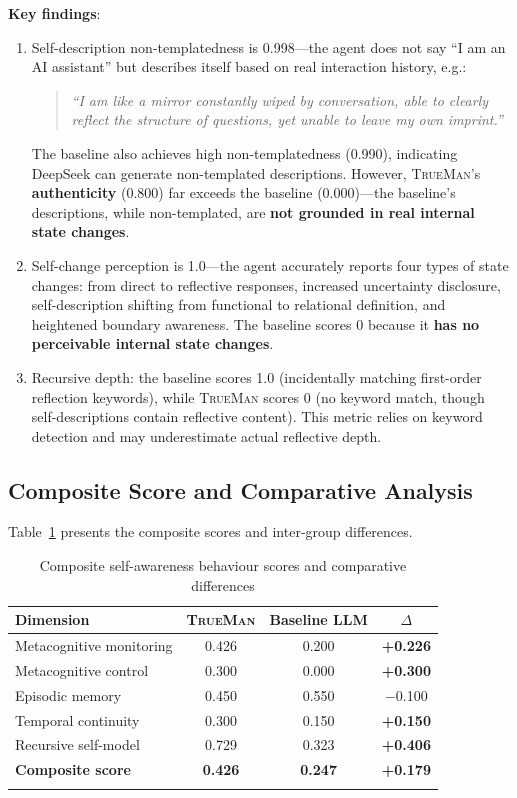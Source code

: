 \documentclass[pdflatex,sn-mathphys-num]{sn-jnl}
\newcommand{\TrueMan}{\textsc{TrueMan}}
\theoremstyle{thmstyleone}%
\theoremstyle{thmstyletwo}%
\theoremstyle{thmstylethree}%
\begin{document}
\textbf{Key findings}:
\begin{enumerate}[leftmargin=2em]
    \item Self-description non-templatedness is 0.998---the agent does not say ``I am an AI assistant'' but describes itself based on real interaction history, e.g.:
    \begin{quote}
    \small\textit{``I am like a mirror constantly wiped by conversation, able to clearly reflect the structure of questions, yet unable to leave my own imprint.''}
    \end{quote}
    The baseline also achieves high non-templatedness (0.990), indicating DeepSeek can generate non-templated descriptions. However, \TrueMan{}'s \textbf{authenticity} (0.800) far exceeds the baseline (0.000)---the baseline's descriptions, while non-templated, are \textbf{not grounded in real internal state changes}.

    \item Self-change perception is 1.0---the agent accurately reports four types of state changes: from direct to reflective responses, increased uncertainty disclosure, self-description shifting from functional to relational definition, and heightened boundary awareness. The baseline scores 0 because it \textbf{has no perceivable internal state changes}.

    \item Recursive depth: the baseline scores 1.0 (incidentally matching first-order reflection keywords), while \TrueMan{} scores 0 (no keyword match, though self-descriptions contain reflective content). This metric relies on keyword detection and may underestimate actual reflective depth.
\end{enumerate}

\subsection{Composite Score and Comparative Analysis}

Table~\ref{tab:overall} presents the composite scores and inter-group differences.

\begin{table}[h]
\caption{Composite self-awareness behaviour scores and comparative differences}\label{tab:overall}%
\begin{tabular}{@{}lccc@{}}
\toprule
Dimension & \TrueMan{} & Baseline LLM & $\Delta$ \\
\midrule
Metacognitive monitoring & 0.426 & 0.200 & \textbf{+0.226} \\
Metacognitive control & 0.300 & 0.000 & \textbf{+0.300} \\
Episodic memory & 0.450 & 0.550 & $-$0.100 \\
Temporal continuity & 0.300 & 0.150 & \textbf{+0.150} \\
Recursive self-model & 0.729 & 0.323 & \textbf{+0.406} \\
\midrule
\textbf{Composite score} & \textbf{0.426} & \textbf{0.247} & \textbf{+0.179} \\
\botrule
\end{tabular}
\end{table}
\end{document}
